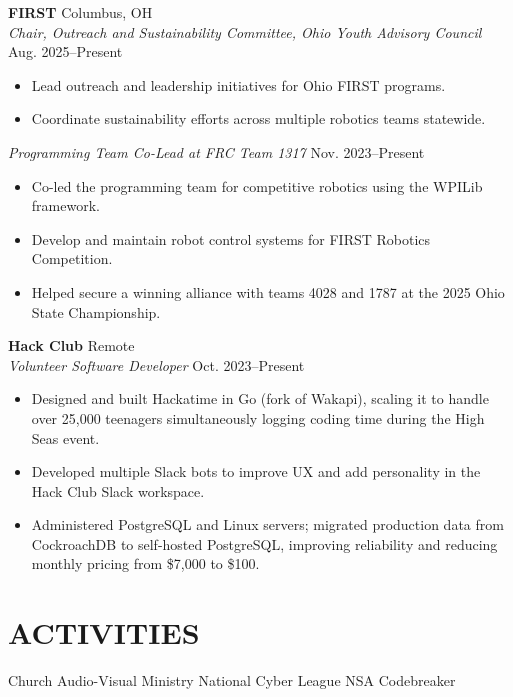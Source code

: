 \documentclass[a4paper,10pt]{article}
\newlength{\mpwidth}
\begin{document}
\textbf{FIRST} \hfill Columbus, OH\\
\textit{Chair, Outreach and Sustainability Committee, Ohio Youth Advisory Council} \hfill Aug. 2025--Present
\begin{minipage}{\mpwidth}
\begin{itemize}[nosep,after=\strut, leftmargin=1em, itemsep=3pt,label=--]
\item Lead outreach and leadership initiatives for Ohio FIRST programs.
\item Coordinate sustainability efforts across multiple robotics teams statewide.
\end{itemize}
\end{minipage}

\textit{Programming Team Co-Lead at FRC Team 1317} \hfill Nov. 2023--Present
\begin{minipage}{\mpwidth}
\begin{itemize}[nosep,after=\strut, leftmargin=1em, itemsep=3pt,label=--]
\item Co-led the programming team for competitive robotics using the WPILib framework.
\item Develop and maintain robot control systems for FIRST Robotics Competition.
\item Helped secure a winning alliance with teams 4028 and 1787 at the 2025 Ohio State Championship.
\end{itemize}
\end{minipage}

\textbf{Hack Club} \hfill Remote\\
\textit{Volunteer Software Developer} \hfill Oct. 2023--Present
\begin{minipage}{\mpwidth}
\begin{itemize}[nosep,after=\strut, leftmargin=1em, itemsep=3pt,label=--]
\item Designed and built Hackatime in Go (fork of Wakapi), scaling it to handle over 25,000 teenagers simultaneously logging coding time during the High Seas event.
\item Developed multiple Slack bots to improve UX and add personality in the Hack Club Slack workspace.
\item Administered PostgreSQL and Linux servers; migrated production data from CockroachDB to self-hosted PostgreSQL, improving reliability and reducing monthly pricing from \$7,000 to \$100.
\end{itemize}
\end{minipage}

\section{ACTIVITIES}
\begin{center}
{\small Church Audio-Visual Ministry \textbar{} National Cyber League \textbar{} NSA Codebreaker}
\end{center}

\vfill
\end{document}
